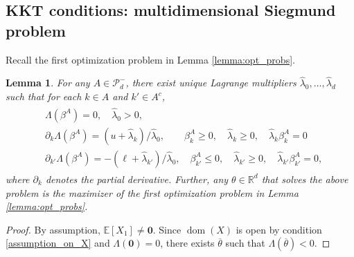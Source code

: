 \documentclass[aap,preprint]{imsart}
\newcommand{\Exp}{{\mathbb{E}}}
\newcommand{\bR}{{\mathbb{R}}}
\theoremstyle{plain}
\newtheorem{lemma}[theorem]{Lemma}
\theoremstyle{definition}
\begin{document}
\begin{appendix}
\subsection{KKT conditions: multidimensional Siegmund problem}\label{app:KKT}
Recall the first optimization problem in  Lemma \ref{lemma:opt_probs}.
\begin{lemma}\label{lemma:app_KKT}
For any $A \in \mathcal{P}_d^{-}$, there exist unique  Lagrange multipliers $\widehat{\lambda}_{0},\ldots,  \widehat{\lambda}_{d}$ such that for each $k \in A$ and $k' \in A^c$,
\begin{align*}%
\begin{split}
& \Lambda(\beta^A) = 0, \quad \widehat{\lambda}_0 > 0, \\
&\partial_k \Lambda(\beta^A) = (u + \widehat{\lambda}_{k})/\widehat{\lambda}_0, \qquad \beta^A_{k} \geq 0, \quad \widehat{\lambda}_k \geq 0, \quad \widehat{\lambda}_k \beta^A_{k} = 0\\
& \partial_{k'} \Lambda(\beta^A) = -(\ell + \widehat{\lambda}_{k'})/\widehat{\lambda}_0, \quad \beta^A_{k'} \leq 0, \quad \widehat{\lambda}_{k'} \geq 0, \quad
\widehat{\lambda}_{k'} \beta^A_{k'} = 0,
\end{split}
\end{align*}
where $\partial_k$ denotes the partial derivative. Further, any $\theta \in \bR^d$ that solves the above problem is the maximizer of the first optimization problem in Lemma \ref{lemma:opt_probs}.
\end{lemma}
\begin{proof}
By assumption, $\Exp[X_1] \neq \mathbf{0}$.  Since $\operatorname{dom}(X)$ is open by condition \eqref{assumption_on_X} and $\Lambda(\mathbf{0}) = 0$, there exists $\overline{\theta}$ such that $\Lambda(\overline{\theta}) < 0$.


\end{proof}
\end{appendix}
\end{document}
